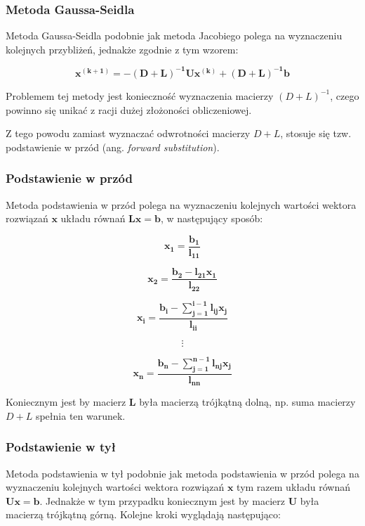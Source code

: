 \documentclass{article}
\begin{document}
\subsubsection{Metoda Gaussa-Seidla}

Metoda Gaussa-Seidla podobnie jak metoda Jacobiego polega 
na wyznaczeniu kolejnych przybliżeń, jednakże zgodnie z tym wzorem:

\begin{equation}
    \boldsymbol{x^{(k+1)} = -(D+L)^{-1}Ux^{(k)} + (D+L)^{-1}b}
\end{equation}

Problemem tej metody jest konieczność wyznaczenia macierzy $(D+L)^{-1}$,
czego powinno się unikać z racji dużej złożoności obliczeniowej.

Z tego powodu zamiast wyznaczać odwrotności macierzy $D+L$,
stosuje się tzw. podstawienie w przód (ang. \textit{forward substitution}).

\subsubsection{Podstawienie w przód}
Metoda podstawienia w przód polega na wyznaczeniu kolejnych
wartości wektora rozwiązań $\boldsymbol{x}$ układu równań $\boldsymbol{Lx = b}$,
w następujący sposób:

\begin{equation*}
    \boldsymbol{x_1 = \frac{b_1}{l_{11}}}
\end{equation*}

\begin{equation*}
    \boldsymbol{x_2 = \frac{b_2 - l_{21}x_1}{l_{22}}}
\end{equation*}

\begin{equation*}
    \boldsymbol{x_i = \frac{b_i - \sum_{j=1}^{i-1}l_{ij}x_j}{l_{ii}}}
\end{equation*}

\begin{equation*}
    \boldsymbol{\vdots}
\end{equation*}

\begin{equation*}
    \boldsymbol{x_n = \frac{b_n - \sum_{j=1}^{n-1}l_{nj}x_j}{l_{nn}}}
\end{equation*}

Koniecznym jest by macierz $\boldsymbol{L}$ była macierzą trójkątną dolną,
np. suma macierzy $D+L$ spełnia ten warunek.

\subsubsection{Podstawienie w tył}
Metoda podstawienia w tył podobnie jak metoda podstawienia w przód
polega na wyznaczeniu kolejnych wartości wektora rozwiązań $\boldsymbol{x}$ tym razem
układu równań $\boldsymbol{Ux = b}$. Jednakże w tym przypadku koniecznym jest
by macierz $\boldsymbol{U}$ była macierzą trójkątną górną.
Kolejne kroki wyglądają następująco:
\end{document}
